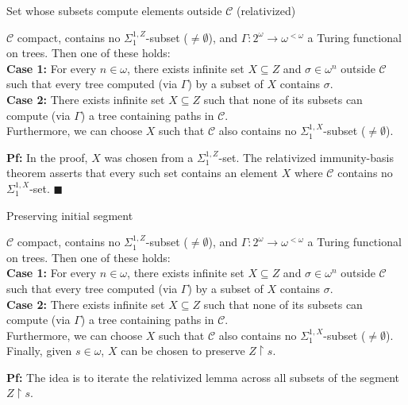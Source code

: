 \begin{frame}{Set whose subsets compute elements outside $\mathcal{C}$
(relativized)}
  \begin{main-lemma*}[Relativized]
    $\mathcal{C}$ compact, contains no $\Sigma_1^{1,Z}$-subset
    ($\neq\emptyset$), and $\Gamma:2^{\omega}\rightarrow \omega^{<\omega}$
    a Turing functional on trees. Then one of these holds:\\
    \vspace{0.5em}
    \textbf{Case 1:} For every $n\in\omega$, there exists infinite set
    $X\subseteq Z$ and $\sigma\in\omega^n$ outside $\mathcal{C}$ such that
    every tree computed (via $\Gamma$) by a subset of $X$ contains
    $\sigma$.\\
    \vspace{0.5em}
    \textbf{Case 2:} There exists infinite set $X\subseteq Z$ such that
    none of its subsets can compute (via $\Gamma$) a tree containing paths
    in $\mathcal{C}$.\\
    \vspace{0.5em}
    Furthermore, we can choose $X$ such that $\mathcal{C}$ also contains no
    $\Sigma_1^{1,X}$-subset ($\neq\emptyset$).
  \end{main-lemma*}

  \textbf{Pf:} In the proof, $X$ was chosen from a $\Sigma_1^{1,Z}$-set.
  The relativized immunity-basis theorem asserts that every such set
  contains an element $X$ where $\mathcal{C}$ contains no
  $\Sigma_1^{1,X}$-set. $\blacksquare$
\end{frame}

\begin{frame}{Preserving initial segment}
  \begin{main-lemma*}
    $\mathcal{C}$ compact, contains no $\Sigma_1^{1,Z}$-subset
    ($\neq\emptyset$), and $\Gamma:2^{\omega}\rightarrow \omega^{<\omega}$
    a Turing functional on trees. Then one of these holds:\\
    \vspace{0.5em}
    \textbf{Case 1:} For every $n\in\omega$, there exists infinite set
    $X\subseteq Z$ and $\sigma\in\omega^n$ outside $\mathcal{C}$ such that
    every tree computed (via $\Gamma$) by a subset of $X$ contains
    $\sigma$.\\
    \vspace{0.5em}
    \textbf{Case 2:} There exists infinite set $X\subseteq Z$ such that
    none of its subsets can compute (via $\Gamma$) a tree containing paths
    in $\mathcal{C}$.\\
    \vspace{0.5em}
    Furthermore, we can choose $X$ such that $\mathcal{C}$ also contains no
    $\Sigma_1^{1,X}$-subset ($\neq\emptyset$).\\
    Finally, given $s\in\omega$, $X$ can be chosen to preserve
    $Z\restriction s$.
  \end{main-lemma*}

  \vspace{0.5em}
  \textbf{Pf:} The idea is to iterate the relativized lemma
  across all subsets of the segment $Z\restriction s$.
\end{frame}

